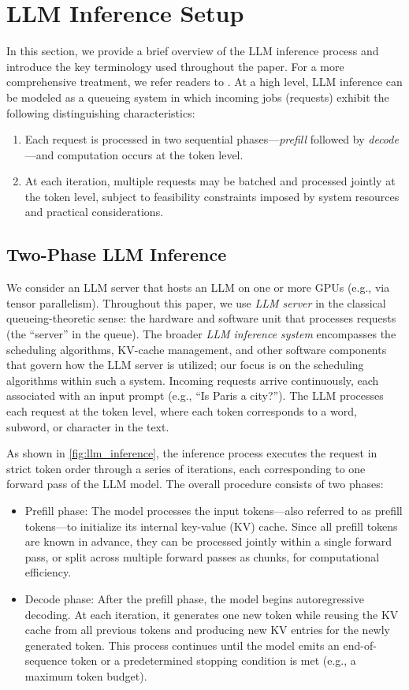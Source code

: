 \documentclass[11pt]{article}
\theoremstyle{plain}
\theoremstyle{definition}
\theoremstyle{remark}
\begin{document}
\section{LLM Inference Setup}\label{sec:model}
In this section, we provide a brief overview of the LLM inference process and introduce the key terminology used throughout the paper. For a more comprehensive treatment, we refer readers to \cite{hashimoto2025cs336}. At a high level, LLM inference can be modeled as a queueing system in which incoming jobs (requests) exhibit the following distinguishing characteristics:
\begin{enumerate}
\item Each request is processed in two sequential phases—\emph{prefill} followed by \emph{decode}—and computation occurs at the token level.
\item At each iteration, multiple requests may be batched and processed jointly at the token level, subject to feasibility constraints imposed by system resources and practical considerations.
\end{enumerate}

\subsection{Two-Phase LLM Inference}
\label{sec:model-setup}

We consider an LLM server that hosts an LLM on one or more GPUs (e.g., via tensor parallelism). Throughout this paper, we use \emph{LLM server} in the classical queueing-theoretic sense: the hardware and software unit that processes requests (the ``server'' in the queue). The broader \emph{LLM inference system} encompasses the scheduling algorithms, KV-cache management, and other software components that govern how the LLM server is utilized; our focus is on the scheduling algorithms within such a system. Incoming requests arrive continuously, each associated with an input prompt (e.g., ``Is Paris a city?''). The LLM processes each request at the token level, where each token corresponds to a word, subword, or character in the text.

As shown in \cref{fig:llm_inference}, the inference process executes the request in strict token order through a series of iterations, each corresponding to one forward pass of the LLM model. The overall procedure consists of two phases:
\begin{itemize}
\item Prefill phase: The model processes the input tokens---also referred to as prefill tokens---to initialize its internal key-value (KV) cache. Since all prefill tokens are known in advance, they can be processed jointly within a single forward pass, or split across multiple forward passes as chunks, for computational efficiency.
\item Decode phase: After the prefill phase, the model begins autoregressive decoding. At each iteration, it generates one new token while reusing the KV cache from all previous tokens and producing new KV entries for the newly generated token. This process continues until the model emits an end-of-sequence token or a predetermined stopping condition is met (e.g., a maximum token budget).
\end{itemize}
\end{document}
